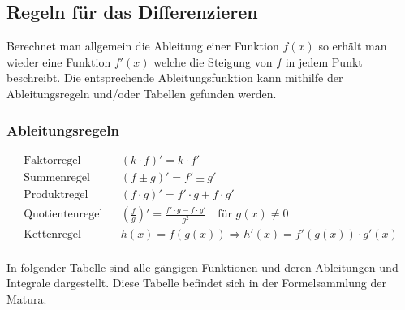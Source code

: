 \subsection{Regeln für das Differenzieren}
Berechnet man allgemein die Ableitung einer Funktion $f(x)$ so erhält man wieder eine Funktion $f'(x)$ welche die Steigung von $f$ in jedem Punkt beschreibt. Die entsprechende Ableitungsfunktion kann mithilfe der Ableitungsregeln und/oder Tabellen gefunden werden.
\subsubsection{Ableitungsregeln}
\begin{align}
    &\text{Faktorregel}     && (k \cdot f)' = k \cdot f' \\[8pt]
    &\text{Summenregel}     && (f \pm g)' = f' \pm g' \\[8pt]
    &\text{Produktregel}    && (f \cdot g)' = f' \cdot g + f \cdot g' \\[8pt]
    &\text{Quotientenregel} && \left(\frac{f}{g}\right)' =
        \frac{f' \cdot g - f \cdot g'}{g^2} \quad \text{für } g(x) \neq 0 \\[8pt]
    &\text{Kettenregel}     && h(x) = f(g(x)) \Rightarrow
        h'(x) = f'(g(x)) \cdot g'(x)
&\end{align}
\\
In folgender Tabelle sind alle gängigen Funktionen und deren Ableitungen und Integrale dargestellt. Diese Tabelle befindet sich in der Formelsammlung der Matura. \\[5pt]
